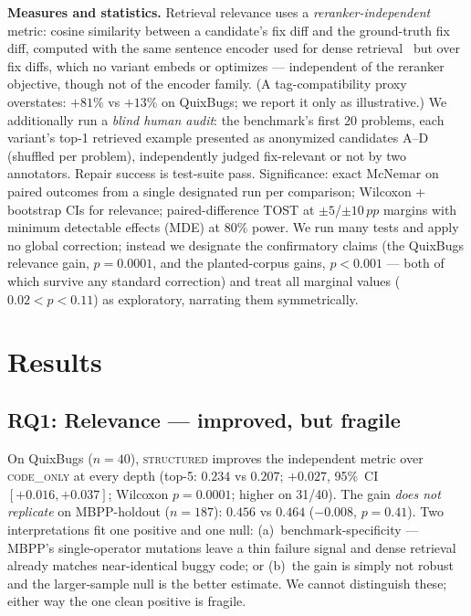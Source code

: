 \documentclass[10pt,conference,a4paper]{IEEEtran}
\newcommand{\structured}{\textsc{structured}\xspace}
\newcommand{\codeonly}{\textsc{code\_only}\xspace}
\newcommand{\pp}{\,pp}
\begin{document}
\textbf{Measures and statistics.} Retrieval relevance uses a
\emph{reranker-independent} metric: cosine similarity between a candidate's
fix diff and the ground-truth fix diff, computed with the same sentence
encoder used for dense retrieval~\cite{sbert} but over fix diffs, which no
variant embeds or optimizes --- independent of the reranker objective,
though not of the encoder family. (A tag-compatibility proxy overstates:
$+81\%$ vs $+13\%$ on QuixBugs; we report it only as illustrative.) We
additionally run a \emph{blind human audit}: the benchmark's first 20
problems, each variant's top-1 retrieved example presented as anonymized
candidates A--D (shuffled per problem), independently judged fix-relevant
or not by two annotators. Repair success is test-suite pass. Significance:
exact McNemar on paired outcomes from a single designated run per
comparison; Wilcoxon + bootstrap CIs for relevance; paired-difference TOST
at $\pm 5$/$\pm 10\pp$ margins with minimum detectable effects (MDE) at
80\% power. We run many tests and apply no global correction; instead we
designate the confirmatory claims (the QuixBugs relevance gain,
$p{=}0.0001$, and the planted-corpus gains, $p{<}0.001$ --- both of which
survive any standard correction) and treat all marginal values
($0.02{<}p{<}0.11$) as exploratory, narrating them symmetrically.

\section{Results}
\label{sec:results}

\subsection{RQ1: Relevance --- improved, but fragile}

On QuixBugs ($n{=}40$), \structured improves the independent metric over
\codeonly at every depth (top-5: $0.234$ vs $0.207$; $+0.027$, 95\%~CI
$[+0.016,+0.037]$; Wilcoxon $p{=}0.0001$; higher on 31/40). The gain
\emph{does not replicate} on MBPP-holdout ($n{=}187$): $0.456$ vs $0.464$
($-0.008$, $p{=}0.41$). Two interpretations fit one positive and one null:
(a)~benchmark-specificity --- MBPP's single-operator mutations leave a thin
failure signal and dense retrieval already matches near-identical buggy
code; or (b)~the gain is simply not robust and the larger-sample null is the
better estimate. We cannot distinguish these; either way the one clean
positive is fragile.
\end{document}

